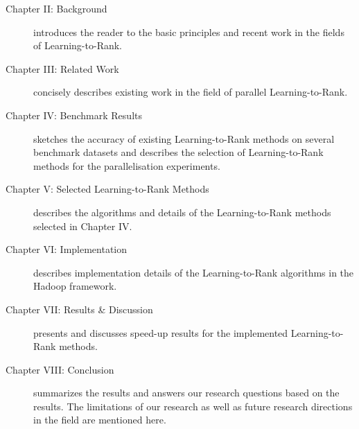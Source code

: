 \begin{description}
\item[Chapter II: Background]{introduces the reader to the basic principles and recent work in the fields of Learning-to-Rank.}
\item[Chapter III: Related Work]{concisely describes existing work in the field of parallel Learning-to-Rank.}
\item[Chapter IV: Benchmark Results]{sketches the accuracy of existing Learning-to-Rank methods on several benchmark datasets and describes the selection of Learning-to-Rank methods for the parallelisation experiments.}
\item[Chapter V: Selected Learning-to-Rank Methods]{describes the algorithms and details of the Learning-to-Rank methods selected in Chapter IV.}
\item[Chapter VI: Implementation]{describes implementation details of the Learning-to-Rank algorithms in the Hadoop framework.}
\item[Chapter VII: Results \& Discussion]{presents and discusses speed-up results for the implemented Learning-to-Rank methods.}
\item[Chapter VIII: Conclusion]{summarizes the results and answers our research questions based on the results. The limitations of our research as well as future research directions in the field are mentioned here.}
\end{description}
